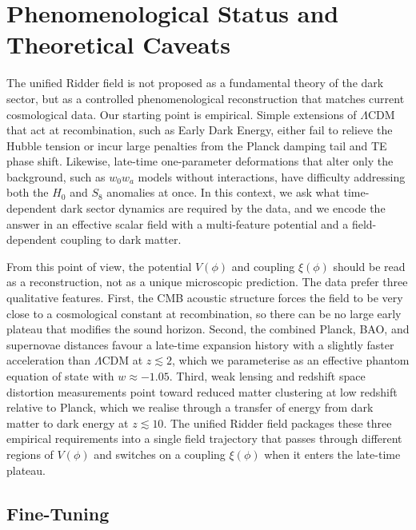 \documentclass[twocolumn,showpacs,preprintnumbers,amsmath,amssymb,prd]{revtex4-2}
\begin{document}
\section{Phenomenological Status and Theoretical Caveats}
\label{sec:status}

The unified Ridder field is not proposed as a fundamental theory of the dark sector, but as a controlled phenomenological reconstruction that matches current cosmological data. Our starting point is empirical. Simple extensions of $\Lambda$CDM that act at recombination, such as Early Dark Energy, either fail to relieve the Hubble tension or incur large penalties from the Planck damping tail and TE phase shift. Likewise, late-time one-parameter deformations that alter only the background, such as $w_0w_a$ models without interactions, have difficulty addressing both the $H_0$ and $S_8$ anomalies at once. In this context, we ask what time-dependent dark sector dynamics are required by the data, and we encode the answer in an effective scalar field with a multi-feature potential and a field-dependent coupling to dark matter.

From this point of view, the potential $V(\phi)$ and coupling $\xi(\phi)$ should be read as a reconstruction, not as a unique microscopic prediction. The data prefer three qualitative features. First, the CMB acoustic structure forces the field to be very close to a cosmological constant at recombination, so there can be no large early plateau that modifies the sound horizon. Second, the combined Planck, BAO, and supernovae distances favour a late-time expansion history with a slightly faster acceleration than $\Lambda$CDM at $z \lesssim 2$, which we parameterise as an effective phantom equation of state with $w \approx -1.05$. Third, weak lensing and redshift space distortion measurements point toward reduced matter clustering at low redshift relative to Planck, which we realise through a transfer of energy from dark matter to dark energy at $z \lesssim 10$. The unified Ridder field packages these three empirical requirements into a single field trajectory that passes through different regions of $V(\phi)$ and switches on a coupling $\xi(\phi)$ when it enters the late-time plateau.

\subsection{Fine-Tuning}
\end{document}
